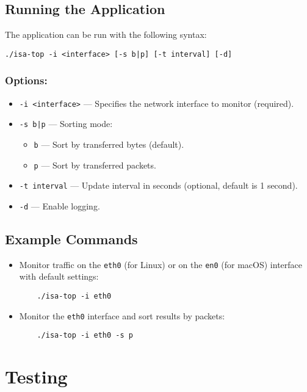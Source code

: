 \documentclass[12pt]{extarticle}
\begin{document}
\subsection{Running the Application}
The application can be run with the following syntax:
\begin{verbatim}
./isa-top -i <interface> [-s b|p] [-t interval] [-d]
\end{verbatim}

\subsubsection*{Options:}
\begin{itemize}
    \item \texttt{-i <interface>} — Specifies the network interface to monitor (required).
    \item \texttt{-s b|p} — Sorting mode:
    \begin{itemize}
        \item \texttt{b} — Sort by transferred bytes (default).
        \item \texttt{p} — Sort by transferred packets.
    \end{itemize}
    \item \texttt{-t interval} — Update interval in seconds (optional, default is 1 second).
    \item \texttt{-d} — Enable logging.
\end{itemize}

\subsection{Example Commands}
\begin{itemize}
    \item Monitor traffic on the \texttt{eth0} (for Linux) or on the \texttt{en0} (for macOS) interface with default settings:
    \begin{verbatim}
    ./isa-top -i eth0
    \end{verbatim}

    \item Monitor the \texttt{eth0} interface and sort results by packets:
    \begin{verbatim}
    ./isa-top -i eth0 -s p
    \end{verbatim}

\end{itemize}

\section{Testing}
\end{document}
